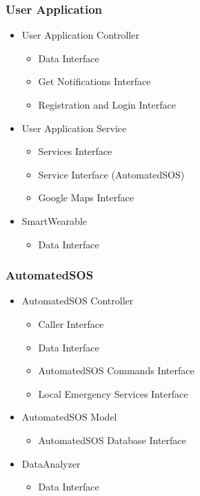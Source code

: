 \documentclass[../../DD.tex]{subfiles}
\begin{document}
		\subsubsection{User Application}
		\begin{itemize}
			\item User Application Controller
			\begin{itemize}
				\item Data Interface
				\item Get Notifications Interface
				\item Registration and Login Interface
			\end{itemize}
			\item User Application Service
			\begin{itemize}
				\item Services Interface
				\item Service Interface (AutomatedSOS)
				\item Google Maps Interface
			\end{itemize}
			\item SmartWearable
			\begin{itemize}
				\item Data Interface
			\end{itemize}
		\end{itemize}
		
		\subsubsection{AutomatedSOS}
		\begin{itemize}
			\item AutomatedSOS Controller
			\begin{itemize}
				\item Caller Interface
				\item Data Interface
				\item AutomatedSOS Commands Interface
				\item Local Emergency Services Interface
			\end{itemize}
			\item AutomatedSOS Model
			\begin{itemize}
				\item AutomatedSOS Database Interface
			\end{itemize}
			\item DataAnalyzer
			\begin{itemize}
				\item Data Interface
			\end{itemize}	
		\end{itemize}
\end{document}
